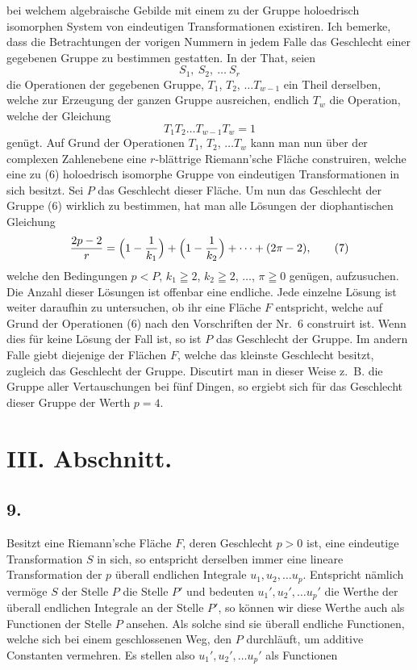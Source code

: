 \documentclass{article}
\begin{document}
bei welchem algebraische Gebilde mit einem zu der Gruppe holoedrisch isomorphen System von eindeutigen Transformationen existiren. Ich bemerke, dass die Betrachtungen der vorigen Nummern in jedem Falle das Geschlecht einer gegebenen Gruppe zu bestimmen gestatten. In der That, seien
\[
S_1, \ S_2, \ \dots \ S_r
\tag{6}
\]
die Operationen der gegebenen Gruppe, $T_1$, $T_2$, $\dots T_{w-1}$ ein Theil derselben, welche zur Erzeugung der ganzen Gruppe ausreichen, endlich $T_w$ die Operation, welche der Gleichung
\[
T_1 T_2 \dots T_{w-1} T_w = 1
\]
genügt. Auf Grund der Operationen $T_1$, $T_2$, $\dots T_w$ kann man nun über der complexen Zahlenebene eine $r$-blättrige Riemann'sche Fläche construiren, welche eine zu (6) holoedrisch isomorphe Gruppe von eindeutigen Transformationen in sich besitzt. Sei $P$ das Geschlecht dieser Fläche. Um nun das Geschlecht der Gruppe (6) wirklich zu bestimmen, hat man alle Lösungen der diophantischen Gleichung
\[
\frac{2p - 2}{r} = \Bigl(1 - \frac{1}{k_1}\Bigr) + \Bigl(1 - \frac{1}{k_2}\Bigr) + \dots + (2\pi - 2),
\tag{7}
\]
welche den Bedingungen $p < P$, $k_1 \geqq 2$, $k_2 \geqq 2$, $\dots$, $\pi \geqq 0$ genügen, aufzusuchen. Die Anzahl dieser Lösungen ist offenbar eine endliche. Jede einzelne Lösung ist weiter daraufhin zu untersuchen, ob ihr eine Fläche $F$ entspricht, welche auf Grund der Operationen (6) nach den Vorschriften der Nr.~6 construirt ist. Wenn dies für keine Lösung der Fall ist, so ist $P$ das Geschlecht der Gruppe. Im andern Falle giebt diejenige der Flächen $F$, welche das kleinste Geschlecht besitzt, zugleich das Geschlecht der Gruppe. Discutirt man in dieser Weise z.~B. die Gruppe aller Vertauschungen bei fünf Dingen, so ergiebt sich für das Geschlecht dieser Gruppe der Werth $p = 4$.

\section*{III. Abschnitt.}

\subsection*{9.}

Besitzt eine Riemann'sche Fläche $F$, deren Geschlecht $p > 0$ ist, eine eindeutige Transformation $S$ in sich, so entspricht derselben immer eine lineare Transformation der $p$ überall endlichen Integrale $u_1, u_2, \dots u_p$. Entspricht nämlich vermöge $S$ der Stelle $P$ die Stelle $P'$ und bedeuten $u_1', u_2', \dots u_p'$ die Werthe der überall endlichen Integrale an der Stelle $P'$, so können wir diese Werthe auch als Functionen der Stelle $P$ ansehen. Als solche sind sie überall endliche Functionen, welche sich bei einem geschlossenen Weg, den $P$ durchläuft, um additive Constanten vermehren. Es stellen also $u_1', u_2', \dots u_p'$ als Functionen
\end{document}
